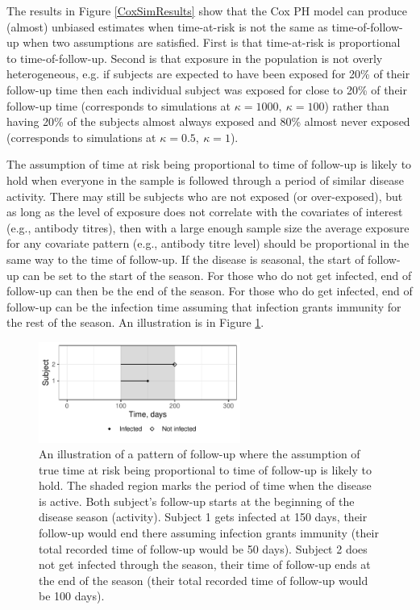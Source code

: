 The results in Figure \ref{CoxSimResults} show that the Cox PH model can produce (almost) unbiased estimates when time-at-risk is not the same as time-of-follow-up when two assumptions are satisfied. First is that time-at-risk is proportional to time-of-follow-up. Second is that exposure in the population is not overly heterogeneous, e.g. if subjects are expected to have been exposed for 20\% of their follow-up time then each individual subject was exposed for close to 20\% of their follow-up time (corresponds to simulations at $\kappa = 1000,\ \kappa = 100$) rather than having 20\% of the subjects almost always exposed and 80\% almost never exposed (corresponds to simulations at $\kappa = 0.5,\ \kappa = 1$).

The assumption of time at risk being proportional to time of follow-up is likely to hold when everyone in the sample is followed through a period of similar disease activity. There may still be subjects who are not exposed (or over-exposed), but as long as the level of exposure does not correlate with the covariates of interest (e.g., antibody titres), then with a large enough sample size the average exposure for any covariate pattern (e.g., antibody titre level) should be proportional in the same way to the time of follow-up. If the disease is seasonal, the start of follow-up can be set to the start of the season. For those who do not get infected, end of follow-up can then be the end of the season. For those who do get infected, end of follow-up can be the infection time assuming that infection grants immunity for the rest of the season. An illustration is in Figure \ref{CoxIdeal}.

\begin{figure}[htp]
	\centering
	\includegraphics[width=0.59\textwidth]{../curve-cox/timeplot_3_light.pdf}
	\caption{
		An illustration of a pattern of follow-up where the assumption of true time at risk being proportional to time of follow-up is likely to hold. The shaded region marks the period of time when the disease is active. Both subject's follow-up starts at the beginning of the disease season (activity). Subject 1 gets infected at 150 days, their follow-up would end there assuming infection grants immunity (their total recorded time of follow-up would be 50 days). Subject 2 does not get infected through the season, their time of follow-up ends at the end of the season (their total recorded time of follow-up would be 100 days).
	}
	\label{CoxIdeal}
\end{figure}


